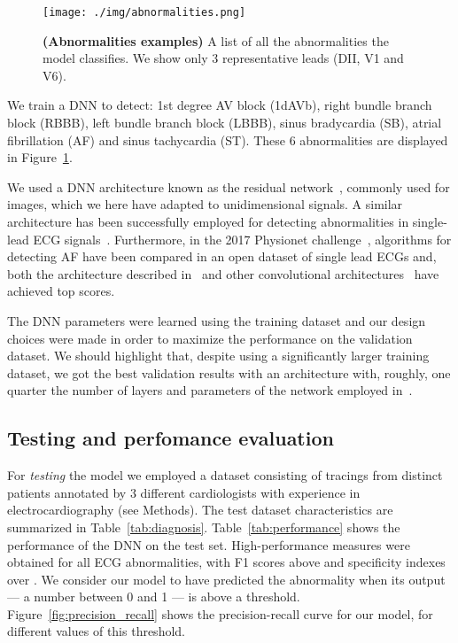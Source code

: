 \documentclass{article}
\begin{document}
\begin{figure}[htpb]
    \centering
    \texttt{[image: ./img/abnormalities.png]}
    \caption{\textbf{(Abnormalities examples)} A list of all the abnormalities the model classifies. We show only 3 representative leads (DII, V1 and V6).}
    \label{fig:abnormalities}
\end{figure}

We train a DNN to detect: 1st degree AV block (1dAVb), right bundle branch block (RBBB), left bundle branch block (LBBB), sinus bradycardia (SB), atrial fibrillation (AF) and sinus tachycardia (ST). These 6 abnormalities are displayed in Figure~\ref{fig:abnormalities}.


We used a DNN architecture known as the residual network~\cite{he_deep_2016}, commonly used for images, which we here have adapted to unidimensional signals. A similar architecture has been successfully employed for detecting abnormalities in single-lead ECG signals~\cite{hannun_cardiologistlevel_2019}. Furthermore, in the  2017 Physionet challenge~\cite{clifford_af_2017}, algorithms for detecting AF have been compared in an open dataset of single lead ECGs and, both the architecture described in~\cite{hannun_cardiologistlevel_2019} and other convolutional architectures~\cite{hong_encase_2017, kamaleswaran_robust_2018} have achieved top scores.

The DNN parameters were learned using the training dataset and our design choices were made in order to maximize the performance on the validation dataset. We should highlight that, despite using a significantly larger training dataset, we got the best validation results with an architecture with, roughly, one quarter the number of layers and parameters of the network employed in~\cite{hannun_cardiologistlevel_2019}.

\subsection{Testing and perfomance evaluation}
For \textit{testing} the model we employed a dataset consisting of  tracings from distinct patients annotated by 3 different cardiologists with experience in electrocardiography (see Methods). The test dataset characteristics are summarized in Table~\ref{tab:diagnosis}. Table~\ref{tab:performance} shows the performance of the DNN on the test set.  High-performance measures were obtained for all ECG abnormalities, with F1 scores above  and specificity indexes over .  We consider our model to have predicted the abnormality when its output --- a number between 0 and 1 --- is above a threshold. Figure~\ref{fig:precision_recall} shows the precision-recall curve for our model, for different values of this threshold. 
\end{document}

